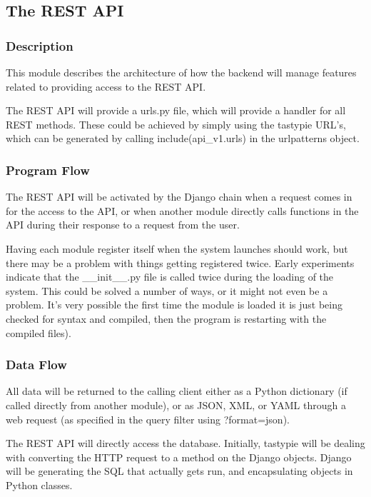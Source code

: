 
\subsection{The REST API}

\subsubsection{Description}

This module describes the architecture of how the backend will manage features related to providing access to the REST API.

The REST API will provide a urls.py file, which will provide a handler for all REST methods.
These could be achieved by simply using the tastypie URL's, which can be generated by calling include(api\_v1.urls) in the urlpatterns object.

\subsubsection{Program Flow}

The REST API will be activated by the Django chain when a request comes in for the access to the API, or when another module directly calls functions in the API during their response to a request from the user.

Having each module register itself when the system launches should work, but there may be a problem with things getting registered twice.
Early experiments indicate that the \_\_init\_\_.py file is called twice during the loading of the system.
This could be solved a number of ways, or it might not even be a problem. 
It's very possible the first time the module is loaded it is just being checked for syntax and compiled, then the program is restarting with the compiled files).

\subsubsection{Data Flow}

All data will be returned to the calling client either as a Python dictionary (if called directly from another module), or as JSON, XML, or YAML through a web request (as specified in the query filter using ?format=json).

The REST API will directly access the database.
Initially, tastypie will be dealing with converting the HTTP request to a method on the Django objects.
Django will be generating the SQL that actually gets run, and encapsulating objects in Python classes.


